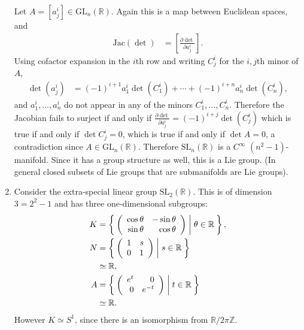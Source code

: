 \begin{xmpl}
\begin{enumerate}
{      Let $A = [a^i_j] \in \mathrm{GL}_n(\mathbb{R})$. Again this is a
      map between Euclidean spaces, and
      \begin{align*}
         \mathrm{Jac}(\det)
      &= \left[ \frac{\partial \det}{\partial a^i_j} \right].
      \end{align*}
      Using cofactor expansion in the $i$th row and writing
      $C^i_j$ for the $i,j$th minor of $A$,
      \begin{align*}
         \det(a^i_j)
      &= (-1)^{i+1} a_1^i \det(C_1^i)
       + \cdots
       + (-1)^{i+n} a_n^i \det(C_n^i),
      \end{align*}
      and $a_1^i, \dots, a_n^i$ do not appear in any of the minors
      $C^i_1, \dots, C^i_n$. Therefore the Jacobian fails to surject
      if and only if
      $
        \frac{\partial \det}{\partial a^i_j}
      = (-1)^{i+j} \det(C_j^i)
      $
      which is true if and only if $\det C_j^i = 0$, which is true if
      and only if $\det A = 0$, a contradiction since
      $A \in \mathrm{GL}_n(\mathbb{R})$. Therefore
      $\mathrm{SL}_n(\mathbb{R})$ is a $C^\infty$ $(n^2 -
      1)$-manifold. Since it has a group structure as well, this is a
      Lie group. (In general closed subsets of Lie groups that are
      submanifolds are Lie groups).
    }
    \item{
      Consider the extra-special linear group
      $\mathrm{SL}_2(\mathbb{R})$. This is of dimension $3 = 2^2 - 1$
      and has three one-dimensional subgroups:
      \begin{align*}
         K
      &= \Set{
           \left(
             \begin{array}{r r}
               \cos \theta & -\sin \theta \\
               \sin \theta &  \cos \theta
             \end{array}
           \right)
           |
           \theta \in \mathbb{R}
         }, \\
         N
      &= \Set{
           \left(
             \begin{array}{r r}
               1 & s \\
               0 & 1
             \end{array}
           \right)
           |
           s \in \mathbb{R}
         } \\
      &\simeq \mathbb{R}, \\
         A
      &= \Set{
           \left(
             \begin{array}{r r}
               e^t & 0 \\
               0   & e^{-t}
             \end{array}
           \right)
           |
           t \in \mathbb{R}
         } \\
      &\simeq \mathbb{R}.
      \end{align*}
      However $K \simeq S^1$, since there is an isomorphism from
      $\mathbb{R} / 2 \pi \mathbb{Z}$.

}
\end{enumerate}
\end{xmpl}
